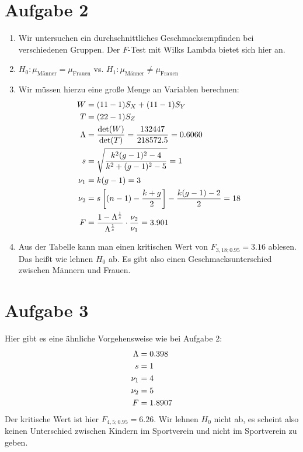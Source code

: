 \documentclass{article}
\begin{document}
	\section*{Aufgabe 2}
	\begin{enumerate}[label=(\alph*)]
		\item Wir untersuchen ein durchschnittliches Geschmacksempfinden bei verschiedenen Gruppen. Der $F$-Test mit Wilks Lambda bietet sich hier an.
		\item $H_0: \mu_{\text{Männer}} = \mu_{\text{Frauen}}$ vs. $H_1:\mu_{\text{Männer}} \neq\mu_{\text{Frauen}}$
		\item Wir müssen hierzu eine große Menge an Variablen berechnen:
		\begin{align}
			W &= (11-1)S_X + (11-1)S_Y \notag \\
			T &= (22-1)S_Z \notag \\
			\Lambda &= \frac{\det(W)}{\det(T)} = \frac{132447}{218572.5} = 0.6060 \notag \\
			s &= \sqrt{\frac{k^2(g-1)^2-4}{k^2+(g-1)^2-5}} = 1 \notag \\
			\nu_1 &= k(g-1) = 3 \notag \\
			\nu_2 &= s\left[(n-1)-\frac{k+g}{2}\right]-\frac{k(g-1)-2}{2} = 18 \notag \\
			F &= \frac{1-\Lambda^{\frac{1}{s}}}{\Lambda^{\frac{1}{s}}}\cdot\frac{\nu_2}{\nu_1} = 3.901 \notag
		\end{align}
		\item Aus der Tabelle kann man einen kritischen Wert von $F_{3,18;0.95}=3.16$ ablesen. Das heißt wie lehnen $H_0$ ab. Es gibt also einen Geschmacksunterschied zwischen Männern und Frauen.
	\end{enumerate}

	\section*{Aufgabe 3}
	Hier gibt es eine ähnliche Vorgehensweise wie bei Aufgabe 2:
	\begin{align}
		\Lambda &= 0.398 \notag \\
		s &= 1 \notag \\
		\nu_1 &= 4 \notag \\
		\nu_2 &= 5 \notag \\
		F &= 1.8907 \notag
	\end{align}
	Der kritische Wert ist hier $F_{4,5;0.95}=6.26$. Wir lehnen $H_0$ nicht ab, es scheint also keinen Unterschied zwischen Kindern im Sportverein und nicht im Sportverein zu geben.
	
\end{document}
